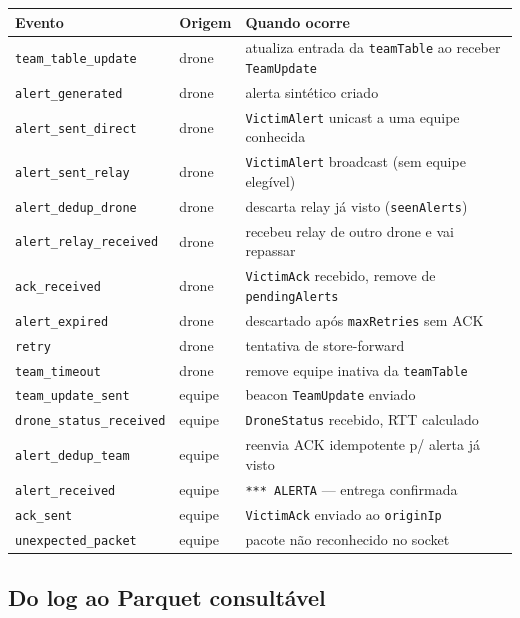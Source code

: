 \documentclass[11pt,a4paper]{article}
\begin{document}
\begin{center}
\begin{tabular}{@{}llp{7.6cm}@{}}
\toprule
\textbf{Evento} & \textbf{Origem} & \textbf{Quando ocorre} \\
\midrule
\texttt{team\_table\_update}   & drone & atualiza entrada da \texttt{teamTable} ao receber \texttt{TeamUpdate} \\
\texttt{alert\_generated}      & drone & alerta sintético criado \\
\texttt{alert\_sent\_direct}   & drone & \texttt{VictimAlert} unicast a uma equipe conhecida \\
\texttt{alert\_sent\_relay}    & drone & \texttt{VictimAlert} broadcast (sem equipe elegível) \\
\texttt{alert\_dedup\_drone}   & drone & descarta relay já visto (\texttt{seenAlerts}) \\
\texttt{alert\_relay\_received}& drone & recebeu relay de outro drone e vai repassar \\
\texttt{ack\_received}         & drone & \texttt{VictimAck} recebido, remove de \texttt{pendingAlerts} \\
\texttt{alert\_expired}        & drone & descartado após \texttt{maxRetries} sem ACK \\
\texttt{retry}                 & drone & tentativa de store-forward \\
\texttt{team\_timeout}         & drone & remove equipe inativa da \texttt{teamTable} \\
\texttt{team\_update\_sent}    & equipe & beacon \texttt{TeamUpdate} enviado \\
\texttt{drone\_status\_received}& equipe & \texttt{DroneStatus} recebido, RTT calculado \\
\texttt{alert\_dedup\_team}    & equipe & reenvia ACK idempotente p/ alerta já visto \\
\texttt{alert\_received}       & equipe & \texttt{*** ALERTA} --- entrega confirmada \\
\texttt{ack\_sent}             & equipe & \texttt{VictimAck} enviado ao \texttt{originIp} \\
\texttt{unexpected\_packet}    & equipe & pacote não reconhecido no socket \\
\bottomrule
\end{tabular}
\end{center}

\subsection{Do log ao Parquet consultável}
\end{document}

